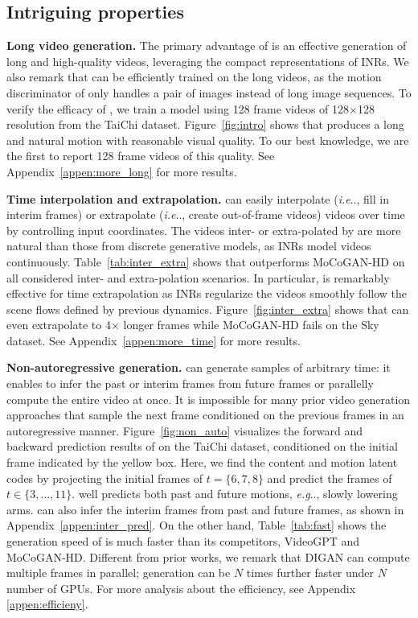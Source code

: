 \documentclass{article} \usepackage{iclr2022_conference,times}
\makeatletter
\DeclareRobustCommand\onedot{\futurelet\@let@token\@onedot}
\def\@onedot{\ifx\@let@token.\else.\null\fi\xspace}
\def\eg{\emph{e.g}\onedot} \def\Eg{\emph{E.g}\onedot}
\def\ie{\emph{i.e}\onedot} \def\Ie{\emph{I.e}\onedot}
\makeatother
\begin{document}
\subsection{Intriguing properties}
\label{subsec:exp-property}

\textbf{Long video generation.}
The primary advantage of \sname is an effective generation of long and high-quality videos, leveraging the compact representations of INRs. We also remark that \sname can be efficiently trained on the long videos, as the motion discriminator of \sname only handles a pair of images instead of long image sequences. To verify the efficacy of \sname, we train a model using 128 frame videos of 128$\times$128 resolution from the TaiChi dataset. Figure~\ref{fig:intro} shows that \sname produces a long and natural motion with reasonable visual quality. To our best knowledge, we are the first to report 128 frame videos of this quality. See Appendix~\ref{appen:more_long} for more results.

\textbf{Time interpolation and extrapolation.}
\sname can easily interpolate (\ie, fill in interim frames) or extrapolate (\ie, create out-of-frame videos) videos over time by controlling input coordinates. The videos inter- or extra-polated by \sname are more natural than those from discrete generative models, as INRs model videos continuously. Table~\ref{tab:inter_extra} shows that \sname outperforms MoCoGAN-HD on all considered inter- and extra-polation scenarios. In particular, \sname is remarkably effective for time extrapolation as INRs regularize the videos smoothly follow the scene flows defined by previous dynamics. Figure~\ref{fig:inter_extra} shows that \sname can even extrapolate to 4$\times$ longer frames while MoCoGAN-HD fails on the Sky dataset. 
See Appendix~\ref{appen:more_time} for more results.

\textbf{Non-autoregressive generation.}
\sname can generate samples of arbitrary time: it enables \sname to infer the past or interim frames from future frames or parallelly compute the entire video at once. It is impossible for many prior video generation approaches that sample the next frame conditioned on the previous frames in an autoregressive manner. Figure~\ref{fig:non_auto} visualizes the forward and backward prediction results of \sname on the TaiChi dataset, conditioned on the initial frame indicated by the yellow box. Here, we find the content and motion latent codes by projecting the initial frames of $t=\{6,7,8\}$ and predict the frames of $t \in \{3,\dots,11\}$. \sname well predicts both past and future motions, \eg, slowly lowering arms. \sname can also infer the interim frames from past and future frames, as shown in Appendix~\ref{appen:inter_pred}. On the other hand, Table~\ref{tab:fast} shows the generation speed of \sname is much faster than its competitors, VideoGPT and MoCoGAN-HD. Different from prior works, we remark that DIGAN can compute multiple frames in parallel; generation can be $N$ times further faster under $N$ number of GPUs. For more analysis about the efficiency, see Appendix \ref{appen:efficieny}.
\end{document}
